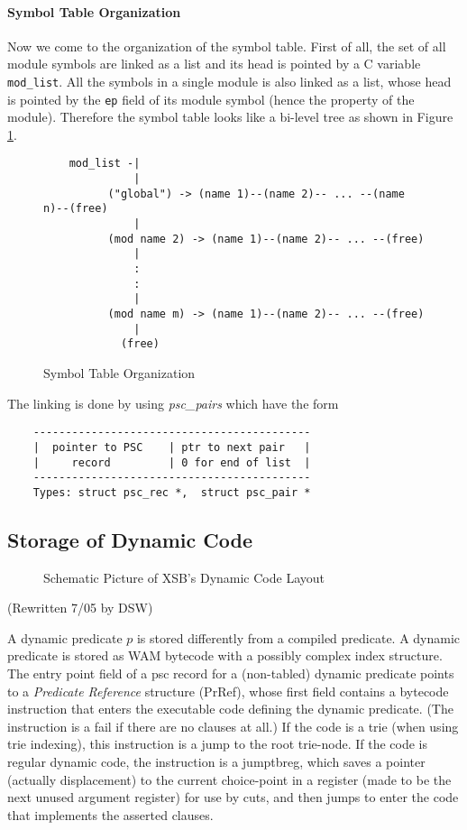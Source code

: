 \documentclass[11pt]{article}
\begin{document}
\paragraph*{Symbol Table Organization}
Now we come to the organization of the symbol table.  First of all,
the set of all module symbols are linked as a list and its head is
pointed by a C variable {\tt mod\_list}. All the symbols in a single
module is also linked as a list, whose head is pointed by the {\tt ep}
field of its module symbol (hence the property of the module).
Therefore the symbol table looks like a bi-level tree as shown in
Figure \ref{f:pscinmem}.

\begin{figure}
\begin{verbatim}
    mod_list -|
              |
          ("global") -> (name 1)--(name 2)-- ... --(name n)--(free)
              |
          (mod name 2) -> (name 1)--(name 2)-- ... --(free)
              |
              :
              :
              |
          (mod name m) -> (name 1)--(name 2)-- ... --(free)
              |
            (free)
\end{verbatim}
\caption{Symbol Table Organization}
\label{f:pscinmem}
\end{figure}

The linking is done by using {\it psc\_pairs} which have the form

\begin{verbatim}
    -------------------------------------------
    |  pointer to PSC    | ptr to next pair   |
    |     record         | 0 for end of list  |
    -------------------------------------------
    Types: struct psc_rec *,  struct psc_pair *
\end{verbatim}


\subsection{Storage of Dynamic Code}

\begin{figure}[htbp]
\caption{Schematic Picture of XSB's Dynamic Code Layout}
\label{fig:dynamic-code}
\end{figure}

(Rewritten 7/05 by DSW)

A dynamic predicate $p$ is stored differently from a compiled
predicate.  A dynamic predicate is stored as WAM bytecode with a
possibly complex index structure.  The entry point field of a psc
record for a (non-tabled) dynamic predicate points to a {\em Predicate
Reference} structure (PrRef), whose first field contains a bytecode
instruction that enters the executable code defining the dynamic
predicate.  (The instruction is a fail if there are no clauses at
all.)  If the code is a trie (when using trie indexing), this
instruction is a jump to the root trie-node.  If the code is regular
dynamic code, the instruction is a jumptbreg, which saves a pointer
(actually displacement) to the current choice-point in a register (made
to be the next unused argument register) for use by cuts, and then
jumps to enter the code that implements the asserted clauses.
\end{document}
